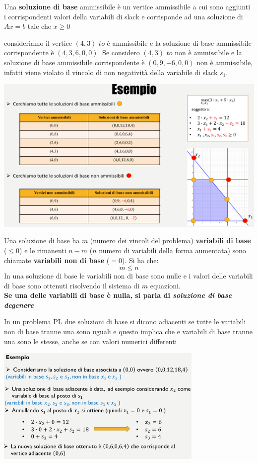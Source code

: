\documentclass[a4paper,12pt, oneside]{book}
\begin{document}
\begin{definizione}
  Una \textbf{soluzione di base} ammissibile è un vertice ammissibile a
  cui sono aggiunti i corrispondenti valori della variabili di slack e
  corrisponde ad una soluzione di $Ax=b$ tale che $x\geq 0$
\end{definizione}
\begin{esempio}
  consideriamo il vertice $(4,3)$ $to$ è ammissibile e la soluzione di base
  ammissibile corrispondente è $(4, 3, 6, 0, 0)$. Se considero $(4,3)$
  $to$ non è ammissibile e la soluzione di base ammissibile corrispondente
  è $(0,9,-6,0,0)$ non è ammissibile, infatti viene violato il vincolo
  di non negatività della variabile di slack $s_1$.\\
  \begin{center}
    \includegraphics[scale = 1]{img/simp21.png}
  \end{center}
\end{esempio}
Una soluzione di base ha $m$ (numero dei vincoli del problema)
\textbf{variabili di base} ($\leq 0$) e le rimanenti $n − m$ ($n$ numero di
variabili della forma aumentata) sono chiamate \textbf{variabili
  non di base} ($=0$). Si ha che:
\[m\leq n\]
In una soluzione di base le variabili non di base sono nulle e i valori delle
variabili di base sono ottenuti risolvendo il sistema di $m$
equazioni.\\
\textbf{Se una delle variabili di base è nulla, si parla di 
  \textit{ soluzione di base degenere}}
\begin{definizione}
  In un problema PL due soluzioni di base si dicono adiacenti se tutte
  le variabili non di base tranne una sono uguali e questo implica che
  e variabili di base tranne una sono le stesse, anche se con 
  valori numerici differenti
\end{definizione}
\begin{center}
  \includegraphics[scale = 1]{img/simp22.png}
\end{center}
\end{document}
